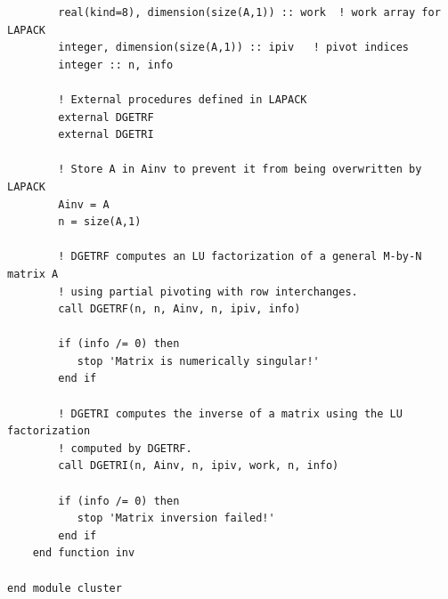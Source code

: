 \documentclass[a4paper]{article}
\begin{document}
\begin{verbatim}
        real(kind=8), dimension(size(A,1)) :: work  ! work array for LAPACK
        integer, dimension(size(A,1)) :: ipiv   ! pivot indices
        integer :: n, info

        ! External procedures defined in LAPACK
        external DGETRF
        external DGETRI

        ! Store A in Ainv to prevent it from being overwritten by LAPACK
        Ainv = A
        n = size(A,1)

        ! DGETRF computes an LU factorization of a general M-by-N matrix A
        ! using partial pivoting with row interchanges.
        call DGETRF(n, n, Ainv, n, ipiv, info)

        if (info /= 0) then
           stop 'Matrix is numerically singular!'
        end if

        ! DGETRI computes the inverse of a matrix using the LU factorization
        ! computed by DGETRF.
        call DGETRI(n, Ainv, n, ipiv, work, n, info)

        if (info /= 0) then
           stop 'Matrix inversion failed!'
        end if
    end function inv
    
end module cluster
\end{verbatim}

 
\end{document}
